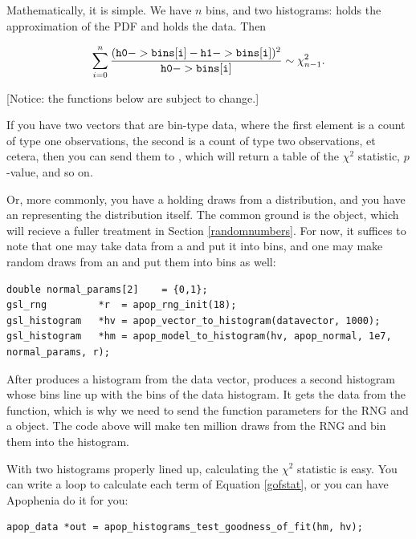 Mathematically, it is simple. We have $n$ bins, and two histograms:
holds the approximation of the PDF and  holds the data. Then 

\begin{equation}    \label{gofstat}
\sum_{i=0}^n {\frac{({\tt h0->bins[i]} - {\tt h1->bins[i]})^2}{{\tt h0->bins[i]}}} \sim \chi^2_{n-1}.
\end{equation}

[Notice: the functions below are subject to change.]

If you have two vectors that are bin-type data, where the first element
is a count of type one observations, the second is a count of type two
observations, et cetera, then you can send them to
, which will return a table
of the $\chi^2$ statistic, $p$-value, and so on.

Or, more commonly, you have a  holding
draws from a distribution, and you have an 
representing the distribution itself. The common ground is the
 object, which will recieve a fuller treatment in
Section \ref{randomnumbers}. For now, it suffices to note that one may
take data from a  and put it into bins, and one may make
random draws from an  and put them into bins as well: 
\begin{lstlisting}
double normal_params[2]    = {0,1};
gsl_rng         *r  = apop_rng_init(18);
gsl_histogram   *hv = apop_vector_to_histogram(datavector, 1000);
gsl_histogram   *hm = apop_model_to_histogram(hv, apop_normal, 1e7, normal_params, r);
\end{lstlisting}

After  produces a histogram from the
data vector,  produces a second histogram
whose bins line up with the bins of the data histogram. It gets the data
from the  function, which is why we need to
send the function parameters for the RNG and a 
object. The code above will make ten million draws from the RNG and bin
them into the  histogram.

With two histograms properly lined up, calculating the $\chi^2$
statistic is easy. You can write a  loop to calculate each
term of Equation \ref{gofstat}, or you can have Apophenia do it for you:
\begin{lstlisting}
apop_data *out = apop_histograms_test_goodness_of_fit(hm, hv);
\end{lstlisting}

